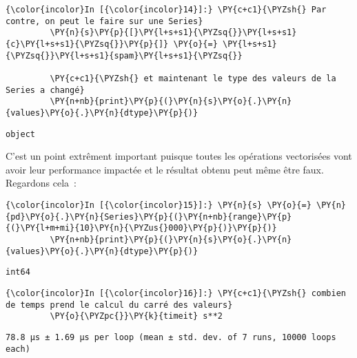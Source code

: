     \begin{Verbatim}[commandchars=\\\{\}]
{\color{incolor}In [{\color{incolor}14}]:} \PY{c+c1}{\PYZsh{} Par contre, on peut le faire sur une Series}
         \PY{n}{s}\PY{p}{[}\PY{l+s+s1}{\PYZsq{}}\PY{l+s+s1}{c}\PY{l+s+s1}{\PYZsq{}}\PY{p}{]} \PY{o}{=} \PY{l+s+s1}{\PYZsq{}}\PY{l+s+s1}{spam}\PY{l+s+s1}{\PYZsq{}}
         
         \PY{c+c1}{\PYZsh{} et maintenant le type des valeurs de la Series a changé}
         \PY{n+nb}{print}\PY{p}{(}\PY{n}{s}\PY{o}{.}\PY{n}{values}\PY{o}{.}\PY{n}{dtype}\PY{p}{)}
\end{Verbatim}


    \begin{Verbatim}[commandchars=\\\{\}]
object

    \end{Verbatim}

    C'est un point extrêment important puisque toutes les opérations
vectorisées vont avoir leur performance impactée et le résultat obtenu
peut même être faux. Regardons cela~:

    \begin{Verbatim}[commandchars=\\\{\}]
{\color{incolor}In [{\color{incolor}15}]:} \PY{n}{s} \PY{o}{=} \PY{n}{pd}\PY{o}{.}\PY{n}{Series}\PY{p}{(}\PY{n+nb}{range}\PY{p}{(}\PY{l+m+mi}{10}\PY{n}{\PYZus{}000}\PY{p}{)}\PY{p}{)}
         \PY{n+nb}{print}\PY{p}{(}\PY{n}{s}\PY{o}{.}\PY{n}{values}\PY{o}{.}\PY{n}{dtype}\PY{p}{)}
\end{Verbatim}


    \begin{Verbatim}[commandchars=\\\{\}]
int64

    \end{Verbatim}

    \begin{Verbatim}[commandchars=\\\{\}]
{\color{incolor}In [{\color{incolor}16}]:} \PY{c+c1}{\PYZsh{} combien de temps prend le calcul du carré des valeurs}
         \PY{o}{\PYZpc{}}\PY{k}{timeit} s**2
\end{Verbatim}


    \begin{Verbatim}[commandchars=\\\{\}]
78.8 µs ± 1.69 µs per loop (mean ± std. dev. of 7 runs, 10000 loops each)

    \end{Verbatim}

